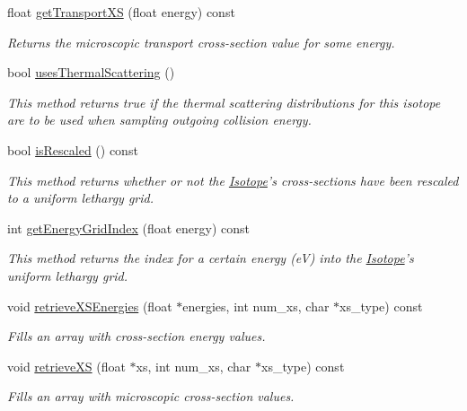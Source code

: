 \begin{DoxyCompactItemize}
float \hyperlink{classIsotope_a2951e0f6c5c3830c19d917c11cd24ee5}{get\-Transport\-X\-S} (float energy) const 
\begin{DoxyCompactList}\small\item\em Returns the microscopic transport cross-\/section value for some energy. \end{DoxyCompactList}\item 
bool \hyperlink{classIsotope_a5b5a90d7b1a3bb88f65bbe806dfe6934}{uses\-Thermal\-Scattering} ()
\begin{DoxyCompactList}\small\item\em This method returns true if the thermal scattering distributions for this isotope are to be used when sampling outgoing collision energy. \end{DoxyCompactList}\item 
bool \hyperlink{classIsotope_ab1f3ff8d24f6c9a184d07987deb5a386}{is\-Rescaled} () const 
\begin{DoxyCompactList}\small\item\em This method returns whether or not the \hyperlink{classIsotope}{Isotope}'s cross-\/sections have been rescaled to a uniform lethargy grid. \end{DoxyCompactList}\item 
int \hyperlink{classIsotope_a87f1130eb8946756f38095b7976becd7}{get\-Energy\-Grid\-Index} (float energy) const 
\begin{DoxyCompactList}\small\item\em This method returns the index for a certain energy (e\-V) into the \hyperlink{classIsotope}{Isotope}'s uniform lethargy grid. \end{DoxyCompactList}\item 
void \hyperlink{classIsotope_aee41dd3daff39c53eaad68839ed869b7}{retrieve\-X\-S\-Energies} (float $\ast$energies, int num\-\_\-xs, char $\ast$xs\-\_\-type) const 
\begin{DoxyCompactList}\small\item\em Fills an array with cross-\/section energy values. \end{DoxyCompactList}\item 
void \hyperlink{classIsotope_a6df521ce57cd296a61c6460219b591a1}{retrieve\-X\-S} (float $\ast$xs, int num\-\_\-xs, char $\ast$xs\-\_\-type) const 
\begin{DoxyCompactList}\small\item\em Fills an array with microscopic cross-\/section values. \end{DoxyCompactList}\item 

\end{DoxyCompactItemize}
